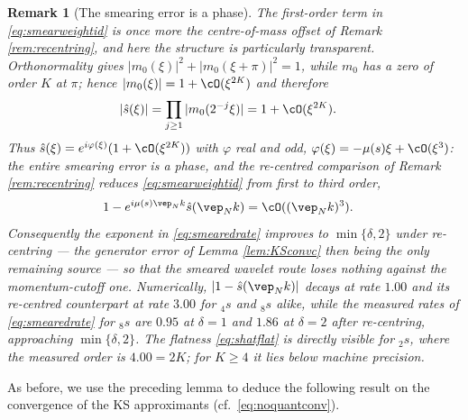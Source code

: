 \documentclass[a4paper, 11pt]{article}
\DeclareMathOperator{\1}{\mathds{1}}
\newtheorem{rem}[thm]{Remark}
\begin{document}
\begin{rem}[The smearing error is a phase]
\label{rem:smearphase}
The first-order term in \eqref{eq:smearweightid} is once more the centre-of-mass offset of Remark \ref{rem:recentring}, and here the structure is particularly transparent. Orthonormality gives $|m_{0}(\xi)|^{2}+|m_{0}(\xi+\pi)|^{2}=1$, while $m_{0}$ has a zero of order $K$ at $\pi$; hence $|m_{0}(\xi)|=1+\cO(\xi^{2K})$ and therefore
\begin{align}
\label{eq:shatflat}
|\hat{s}(\xi)| & = \prod_{j\geq1}|m_{0}(2^{-j}\xi)| = 1+\cO(\xi^{2K}).
\end{align}
Thus $\hat{s}(\xi)=e^{i\varphi(\xi)}(1+\cO(\xi^{2K}))$ with $\varphi$ real and odd, $\varphi(\xi)=-\mu(s)\xi+\cO(\xi^{3})$: \emph{the entire smearing error is a phase}, and the re-centred comparison of Remark \ref{rem:recentring} reduces \eqref{eq:smearweightid} from first to \emph{third} order,
\begin{align*}
1-e^{i\mu(s)\vep_{N}k}\hat{s}(\vep_{N}k) & = \cO((\vep_{N}k)^{3}).
\end{align*}
Consequently the exponent in \eqref{eq:smearedrate} improves to $\min\{\delta,2\}$ under re-centring --- the generator error of Lemma \ref{lem:KSconvc} then being the only remaining source --- so that the smeared wavelet route loses nothing against the momentum-cutoff one. Numerically, $|1-\hat{s}(\vep_{N}k)|$ decays at rate $1.00$ and its re-centred counterpart at rate $3.00$ for $_{4}s$ and $_{8}s$ alike, while the measured rates of \eqref{eq:smearedrate} for $_{8}s$ are $0.95$ at $\delta=1$ and $1.86$ at $\delta=2$ after re-centring, approaching $\min\{\delta,2\}$. The flatness \eqref{eq:shatflat} is directly visible for $_{2}s$, where the measured order is $4.00=2K$; for $K\geq4$ it lies below machine precision.
\end{rem}
As before, we use the preceding lemma to deduce the following result on the convergence of the KS approximants (cf.~\eqref{eq:noquantconv}).
\end{document}
